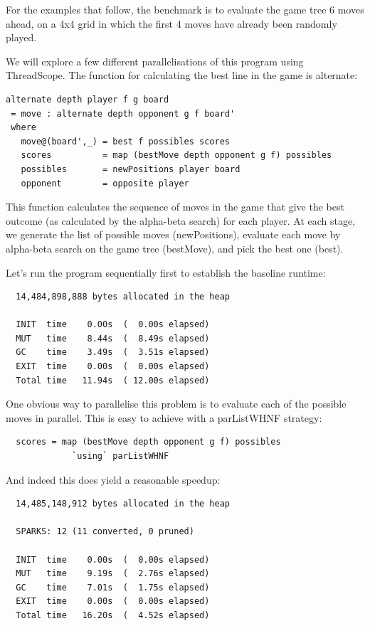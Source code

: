 \documentclass[twocolumn,9pt]{sigplanconf}
\newcommand{\codef}[1]{{\fontfamily{cmss}\small#1}}
\begin{document}
For the examples that follow, the benchmark is to evaluate the game
tree 6 moves ahead, on a 4x4 grid in which the first 4 moves have
already been randomly played.

We will explore a few different parallelisations of this program using
ThreadScope.  The function for calculating the best line in the game
is \codef{alternate}:

\begin{lstlisting}
alternate depth player f g board
 = move : alternate depth opponent g f board'
 where
   move@(board',_) = best f possibles scores
   scores          = map (bestMove depth opponent g f) possibles
   possibles       = newPositions player board
   opponent        = opposite player
\end{lstlisting}

This function calculates the sequence of moves in the game that give
the best outcome (as calculated by the alpha-beta search) for each
player.  At each stage, we generate the list of possible moves
(\codef{newPositions}), evaluate each move by alpha-beta search on the
game tree (\codef{bestMove}), and pick the best one (\codef{best}).

Let's run the program sequentially first to establish the baseline
runtime:

\begin{verbatim}
  14,484,898,888 bytes allocated in the heap

  INIT  time    0.00s  (  0.00s elapsed)
  MUT   time    8.44s  (  8.49s elapsed)
  GC    time    3.49s  (  3.51s elapsed)
  EXIT  time    0.00s  (  0.00s elapsed)
  Total time   11.94s  ( 12.00s elapsed)
\end{verbatim}

One obvious way to parallelise this problem is to evaluate each of the
possible moves in parallel.  This is easy to achieve with a
\codef{parListWHNF} strategy:

\begin{lstlisting}
  scores = map (bestMove depth opponent g f) possibles
             `using` parListWHNF
\end{lstlisting}

And indeed this does yield a reasonable speedup:

\begin{verbatim}
  14,485,148,912 bytes allocated in the heap

  SPARKS: 12 (11 converted, 0 pruned)

  INIT  time    0.00s  (  0.00s elapsed)
  MUT   time    9.19s  (  2.76s elapsed)
  GC    time    7.01s  (  1.75s elapsed)
  EXIT  time    0.00s  (  0.00s elapsed)
  Total time   16.20s  (  4.52s elapsed)
\end{verbatim}
\end{document}
